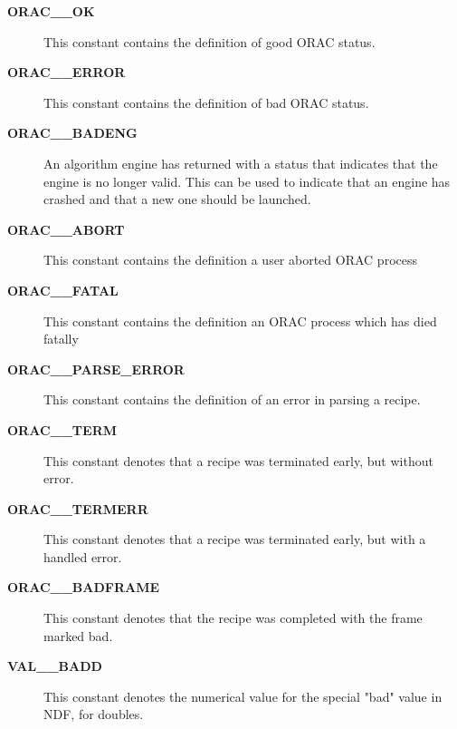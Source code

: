 \begin{description}

\item[{\textbf{ORAC\_\_OK}}] \mbox{}

This constant contains the definition of good ORAC status.


\item[{\textbf{ORAC\_\_ERROR}}] \mbox{}

This constant contains the definition of bad ORAC status.


\item[{\textbf{ORAC\_\_BADENG}}] \mbox{}

An algorithm engine has returned with a status that indicates
that the engine is no longer valid. This can be used to
indicate that an engine has crashed and that a new one should be
launched.


\item[{\textbf{ORAC\_\_ABORT}}] \mbox{}

This constant contains the definition a user aborted ORAC process


\item[{\textbf{ORAC\_\_FATAL}}] \mbox{}

This constant contains the definition an ORAC process which has died fatally


\item[{\textbf{ORAC\_\_PARSE\_ERROR}}] \mbox{}

This constant contains the definition of an error in parsing a recipe.


\item[{\textbf{ORAC\_\_TERM}}] \mbox{}

This constant denotes that a recipe was terminated early, but without
error.


\item[{\textbf{ORAC\_\_TERMERR}}] \mbox{}

This constant denotes that a recipe was terminated early, but with
a handled error.


\item[{\textbf{ORAC\_\_BADFRAME}}] \mbox{}

This constant denotes that the recipe was completed with the
frame marked bad.


\item[{\textbf{VAL\_\_BADD}}] \mbox{}

This constant denotes the numerical value for the special "bad" value
in NDF, for doubles.

\end{description}
